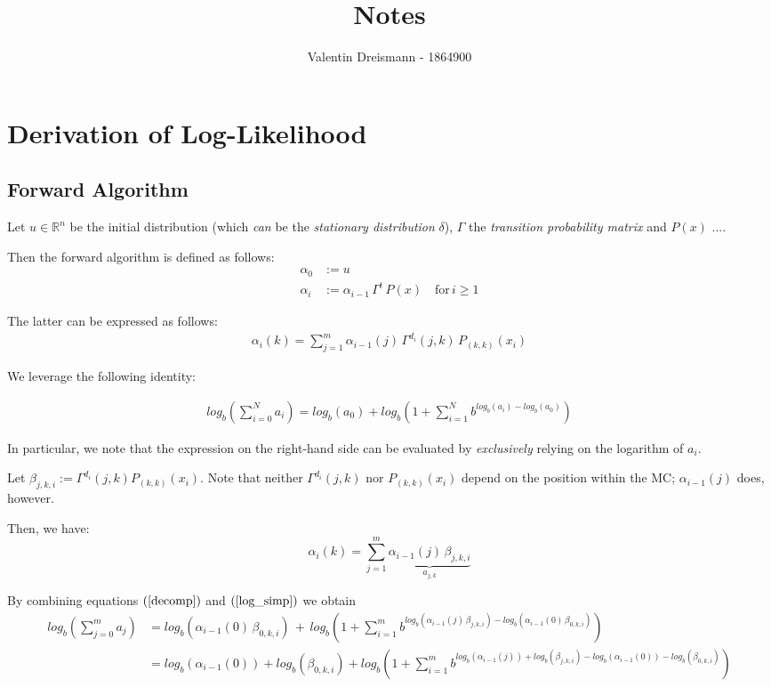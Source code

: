 \documentclass[]{article}
\title{Notes}
\author{ Valentin Dreismann - 1864900}
\newcommand{\rn}{\mathbb{R}}
\begin{document}
\maketitle

\section{Derivation of Log-Likelihood}

\subsection{Forward Algorithm}
Let $u \in \rn^n$ be the initial distribution (which \textit{can} be the \textit{stationary distribution} $\delta$), $\Gamma$ the \textit{transition probability matrix} and $P(x)$ .... 

Then the forward algorithm is defined as follows:
\begin{align*}
\alpha_0 &:= u \\
\alpha_i &:= \alpha_{i-1} \, \Gamma^t \, P(x) \quad \text{for}\, i \geq 1
\end{align*}

The latter can be expressed as follows:
\begin{align*}
	\alpha_i(k) = \sum_{j=1}^m \alpha_{i-1}(j) \, \Gamma^{d_i}(j,k) \, P_{(k, k)}(x_i)
\end{align*}

We leverage the following identity:

\begin{align}
log_b\left( \sum_{i=0}^N a_i \right) = 
log_b(a_0) + log_b\left(1 + \sum_{i=1}^N b^{log_b(a_i) - log_b(a_0)}\right)
\label{log_simp}
\end{align}

In particular, we note that the expression on the right-hand side can be evaluated by \textit{exclusively} relying on the logarithm of $a_i$. 

Let $ \beta_{j, k, i} := \Gamma^{d_i}(j,k) P_{(k, k)}(x_i)$. Note that neither $\Gamma^{d_i}(j,k)$ nor $ P_{(k, k)}(x_i)$ depend on the position within the MC; $\alpha_{i-1}(j)$ does, however. 

Then, we have:
\begin{equation}
	\alpha_i(k) = \sum_{j=1}^m \underbrace{\alpha_{i-1}(j) \, \beta_{j, k, i}}_{a_{j, k}}
	\label{decomp}
\end{equation}

By combining equations $(\ref{decomp})$ and $(\ref{log_simp})$ we obtain
\begin{align}
	log_b\left( \sum_{j=0}^m a_j \right) &=
		log_b \left( \alpha_{i-1}(0) \, \beta_{0, k, i} \right) 
		\, + \, 
		log_b \left(
			1 + \sum_{i=1}^m b^{
				log_b(\alpha_{i-1}(j) \, \beta_{j, k, i})
			   - log_b(\alpha_{i-1}(0) \, \beta_{0, k, i})
			}
		\right) \nonumber \\
		&= log_b(\alpha_{i-1}(0)) + log_b(\beta_{0, k, i}) 
		 + log_b \left(
		 	1 + \sum_{i=1}^m b^{
		 		log_b(\alpha_{i-1}(j)) + log_b(\beta_{j, k, i})
		 		- log_b(\alpha_{i-1}(0)) - log_b(\beta_{0, k, i})
	 		}
		 \right)
\end{align}
\end{document}
